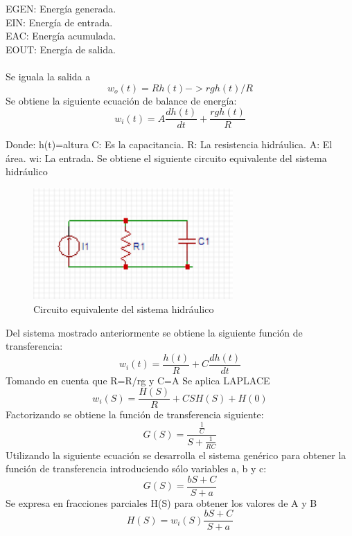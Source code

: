 \documentclass[12pt,letterpaper]{article}     %
\begin{document}
EGEN: Energía generada.\\
EIN: Energía de entrada.\\
EAC: Energía acumulada.\\
EOUT: Energía de salida.\\\\
Se iguala la salida a 
\[
w_{o}(t)=Rh(t) -> rgh(t)/R
\]
Se obtiene la siguiente ecuación de balance de energía:
\begin{equation}\label{eq:ej1}
w_{i}(t) = A\frac{dh(t)}{dt} +\frac{rgh(t)}{R} 
\end{equation}

Donde:
h(t)=altura
C: Es la capacitancia.
R: La resistencia hidráulica.
A: El área.
wi: La entrada.
Se obtiene el siguiente circuito equivalente del sistema hidráulico

\begin{figure}[h!]
\centering
\includegraphics[width=3in]{7}
\caption{Circuito equivalente del sistema hidráulico}
\end{figure}
Del sistema mostrado anteriormente se obtiene la siguiente función de transferencia:
\begin{equation}\label{eq:ej2}
w_{i}(t) = \frac{h(t)}{R} +C\frac{dh(t)}{dt} 
\end{equation}
Tomando en cuenta que R=R/rg y C=A
Se aplica LAPLACE
\begin{equation}\label{eq:ej3}
w_{i}(S) = \frac{H(S)}{R} +CSH(S)+H(0) 
\end{equation}
Factorizando  se obtiene la función de transferencia siguiente:
\begin{equation}\label{eq:ej4}
G(S) = \frac{\frac{1}{C}}{S+\frac{1}{RC}}
\end{equation}
Utilizando la siguiente ecuación se desarrolla el sistema genérico para obtener la función de transferencia introduciendo sólo variables a, b y c:
\begin{equation}\label{eq:ej5}
G(S) = \frac{bS+C}{S+a}
\end{equation}
Se expresa en fracciones parciales H(S) para obtener los valores de A y B
\begin{equation}\label{eq:ej6}
H(S) = w_{i}(S)\frac{bS+C}{S+a}
\end{equation}
\end{document}
